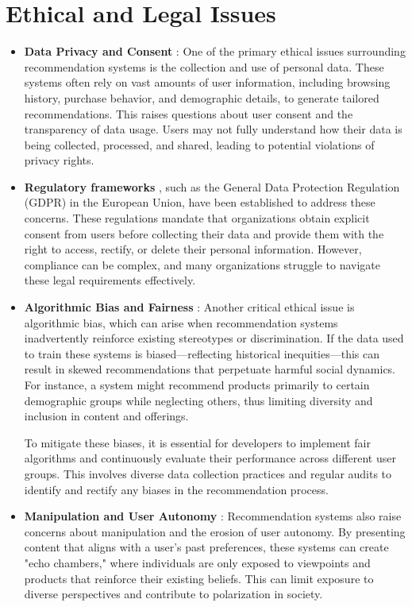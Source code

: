 \documentclass[10pt,twoside,slovak,a4paper]{article}
\begin{document}
\section{Ethical and Legal Issues} \label{Ethical and Legal Issues}
\begin{itemize}



\item \textbf{Data Privacy and Consent} :
One of the primary ethical issues surrounding recommendation systems is the collection and use of personal data\cite{problems}. These systems often rely on vast amounts of user information, including browsing history, purchase behavior, and demographic details, to generate tailored recommendations. This raises questions about user consent and the transparency of data usage. Users may not fully understand how their data is being collected, processed, and shared, leading to potential violations of privacy rights.

\item \textbf{Regulatory frameworks} , such as the General Data Protection Regulation (GDPR) in the European Union, have been established to address these concerns. These regulations mandate that organizations obtain explicit consent from users before collecting their data and provide them with the right to access, rectify, or delete their personal information\cite{ethical}. However, compliance can be complex, and many organizations struggle to navigate these legal requirements effectively.

\newpage
\item \textbf{Algorithmic Bias and Fairness} :
Another critical ethical issue is algorithmic bias\cite{problems}, which can arise when recommendation systems inadvertently reinforce existing stereotypes or discrimination. If the data used to train these systems is biased—reflecting historical inequities—this can result in skewed recommendations that perpetuate harmful social dynamics. For instance, a system might recommend products primarily to certain demographic groups while neglecting others, thus limiting diversity and inclusion in content and offerings.

To mitigate these biases, it is essential for developers to implement fair algorithms and continuously evaluate their performance across different user groups. This involves diverse data collection practices and regular audits to identify and rectify any biases in the recommendation process.

\item \textbf{Manipulation and User Autonomy} :
Recommendation systems also raise concerns about manipulation and the erosion of user autonomy\cite{problems}. By presenting content that aligns with a user’s past preferences, these systems can create "echo chambers," where individuals are only exposed to viewpoints and products that reinforce their existing beliefs. This can limit exposure to diverse perspectives and contribute to polarization in society.



\end{itemize}
\end{document}
